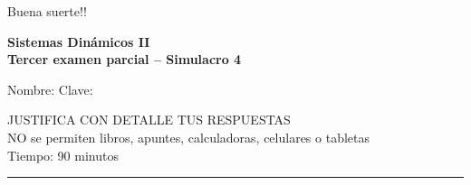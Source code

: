 \documentclass[11pt]{article}
\begin{document}
\vspace{0.5cm}
\begin{center}
\Large Buena suerte!!
\end{center}

\newpage
\textbf{Sistemas Dinámicos II}\\
\textbf{Tercer examen parcial -- Simulacro 4}

\vspace{0.6cm}
Nombre: \underline{\hspace{9cm}} \quad Clave: \underline{\hspace{3cm}}

\vspace{0.5cm}
\begin{center}
JUSTIFICA CON DETALLE TUS RESPUESTAS\\
NO se permiten libros, apuntes, calculadoras, celulares o tabletas\\
Tiempo: 90 minutos
\end{center}
\vspace{-0.2cm}
\rule{\textwidth}{0.4pt}
\vspace{0.2cm}
\end{document}
